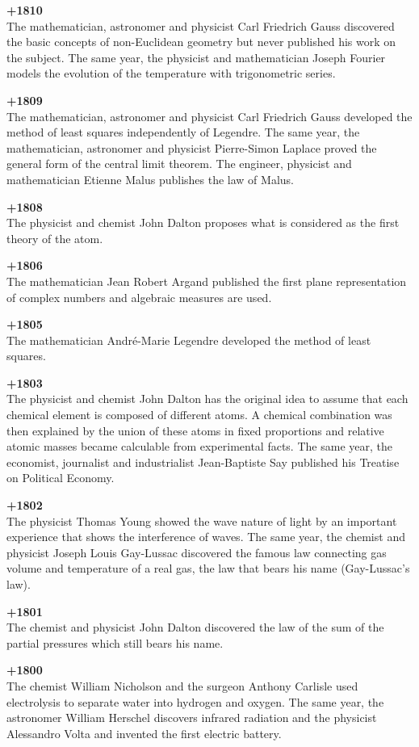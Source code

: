 \textbf{+1810}\\
The mathematician, astronomer and physicist Carl Friedrich Gauss discovered the basic concepts of non-Euclidean geometry but never published his work on the subject. The same year, the physicist and mathematician Joseph Fourier models the evolution of the temperature with trigonometric series.

\textbf{+1809}\\
The mathematician, astronomer and physicist Carl Friedrich Gauss developed the method of least squares independently of Legendre. The same year, the mathematician, astronomer and physicist Pierre-Simon Laplace proved the general form of the central limit theorem. The engineer, physicist and mathematician Etienne Malus publishes the law of Malus.

\textbf{+1808}\\
The physicist and chemist John Dalton proposes what is considered as the first theory of the atom.

\textbf{+1806}\\
The mathematician Jean Robert Argand published the first plane representation of complex numbers and algebraic measures are used.

\textbf{+1805}\\
The mathematician André-Marie Legendre developed the method of least squares.

\textbf{+1803}\\
The physicist and chemist John Dalton has the original idea to assume that each chemical element is composed of different atoms. A chemical combination was then explained by the union of these atoms in fixed proportions and relative atomic masses became calculable from experimental facts. The same year, the economist, journalist and industrialist Jean-Baptiste Say published his Treatise on Political Economy.

\textbf{+1802}\\
The physicist Thomas Young showed the wave nature of light by an important experience that shows the interference of waves. The same year, the chemist and physicist Joseph Louis Gay-Lussac discovered the famous law connecting gas volume and temperature of a real gas, the law that bears his name (Gay-Lussac's law).

\textbf{+1801}\\
The chemist and physicist John Dalton discovered the law of the sum of the partial pressures which still bears his name.

\textbf{+1800}\\
The chemist William Nicholson and the surgeon Anthony Carlisle used electrolysis to separate water into hydrogen and oxygen. The same year, the astronomer William Herschel discovers infrared radiation and the physicist Alessandro Volta and invented the first electric battery.

